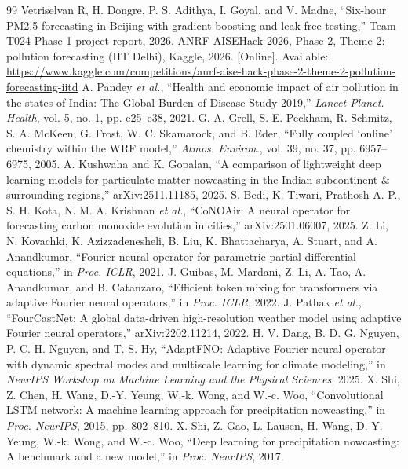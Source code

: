 \documentclass[conference]{IEEEtran}
\begin{document}
\begin{thebibliography}{99}
 Vetriselvan R, H. Dongre, P. S. Adithya, I. Goyal, and V. Madne, ``Six-hour PM2.5 forecasting in Beijing with gradient boosting and leak-free testing,'' Team T024 Phase 1 project report, 2026.
 ANRF AISEHack 2026, Phase 2, Theme 2: pollution forecasting (IIT Delhi), Kaggle, 2026. [Online]. Available: \url{https://www.kaggle.com/competitions/anrf-aise-hack-phase-2-theme-2-pollution-forecasting-iitd}
 A. Pandey \emph{et al.}, ``Health and economic impact of air pollution in the states of India: The Global Burden of Disease Study 2019,'' \emph{Lancet Planet. Health}, vol. 5, no. 1, pp. e25--e38, 2021.
 G. A. Grell, S. E. Peckham, R. Schmitz, S. A. McKeen, G. Frost, W. C. Skamarock, and B. Eder, ``Fully coupled `online' chemistry within the WRF model,'' \emph{Atmos. Environ.}, vol. 39, no. 37, pp. 6957--6975, 2005.
 A. Kushwaha and K. Gopalan, ``A comparison of lightweight deep learning models for particulate-matter nowcasting in the Indian subcontinent \& surrounding regions,'' arXiv:2511.11185, 2025.
 S. Bedi, K. Tiwari, Prathosh A. P., S. H. Kota, N. M. A. Krishnan \emph{et al.}, ``CoNOAir: A neural operator for forecasting carbon monoxide evolution in cities,'' arXiv:2501.06007, 2025.
 Z. Li, N. Kovachki, K. Azizzadenesheli, B. Liu, K. Bhattacharya, A. Stuart, and A. Anandkumar, ``Fourier neural operator for parametric partial differential equations,'' in \emph{Proc. ICLR}, 2021.
 J. Guibas, M. Mardani, Z. Li, A. Tao, A. Anandkumar, and B. Catanzaro, ``Efficient token mixing for transformers via adaptive Fourier neural operators,'' in \emph{Proc. ICLR}, 2022.
 J. Pathak \emph{et al.}, ``FourCastNet: A global data-driven high-resolution weather model using adaptive Fourier neural operators,'' arXiv:2202.11214, 2022.
 H. V. Dang, B. D. G. Nguyen, P. C. H. Nguyen, and T.-S. Hy, ``AdaptFNO: Adaptive Fourier neural operator with dynamic spectral modes and multiscale learning for climate modeling,'' in \emph{NeurIPS Workshop on Machine Learning and the Physical Sciences}, 2025.
 X. Shi, Z. Chen, H. Wang, D.-Y. Yeung, W.-k. Wong, and W.-c. Woo, ``Convolutional LSTM network: A machine learning approach for precipitation nowcasting,'' in \emph{Proc. NeurIPS}, 2015, pp. 802--810.
 X. Shi, Z. Gao, L. Lausen, H. Wang, D.-Y. Yeung, W.-k. Wong, and W.-c. Woo, ``Deep learning for precipitation nowcasting: A benchmark and a new model,'' in \emph{Proc. NeurIPS}, 2017.

\end{thebibliography}
\end{document}
